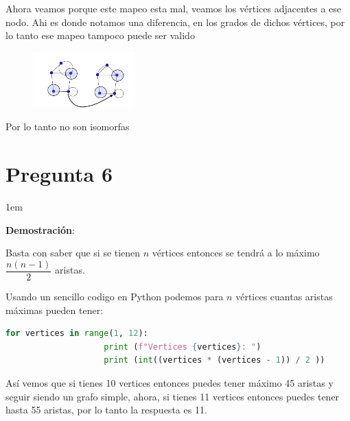 \documentclass[12pt, fleqn]{article}                            %
\newenvironment{SmallIndentation}[1][0.75em]                    %
        {\begin{adjustwidth}{#1}{}\begin{footnotesize}}             %
        {\end{footnotesize}\end{adjustwidth}}                       %
\theoremstyle{break}                                            %
\begin{document}
    Ahora veamos porque este mapeo esta mal, veamos los vértices adjacentes a ese nodo.
    Ahi es donde notamos una diferencia, en los grados de dichos vértices, por lo tanto ese mapeo tampoco puede ser valido
    \begin{figure}[h]
        \centering
        \includegraphics[width=0.35\textwidth]{Question42}
    \end{figure}

    Por lo tanto no son isomorfas
    



    \clearpage
    \section{Pregunta 6}

        \begin{SmallIndentation}[1em]
            \textbf{Demostración}:
        
            Basta con saber que si se tienen $n$ vértices entonces se tendrá a lo máximo $\dfrac{n (n-1)}{2}$ aristas.

            Usando un sencillo codigo en Python podemos para $n$ vértices cuantas aristas máximas pueden tener:

            \begin{lstlisting}[language=python, gobble=12]
                for vertices in range(1, 12):
                    print (f"Vertices {vertices}: ")
                    print (int((vertices * (vertices - 1)) / 2 ))
            \end{lstlisting}

            Así vemos que si tienes 10 vertices entonces puedes tener máximo 45 aristas y seguir siendo un grafo simple,
            ahora, si tienes 11 vertices entonces puedes tener hasta 55 aristas, por lo tanto la respuesta es 11.

        \end{SmallIndentation}


\end{document}
